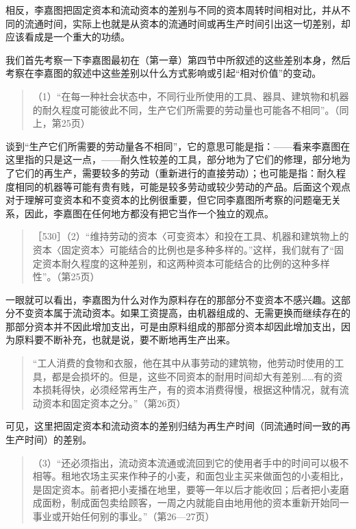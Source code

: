 相反，李嘉图把固定资本和流动资本的差别与不同的资本周转时间相对比，并从不同的流通时间，实际上也就是从资本的流通时间或再生产时间引出这一切差别，却应该看成是一个重大的功绩。

我们首先考察一下李嘉图最初在（第一章）第四节中所叙述的这些差别本身，然后考察在李嘉图的叙述中这些差别以什么方式影响或引起“相对价值”的变动。

\begin{quote}{（1）“在每一种社会状态中，不同行业所使用的工具、器具、建筑物和机器的耐久程度可能彼此不同，生产它们所需要的劳动量也可能各不相同”。（同上，第25页）}\end{quote}

谈到“生产它们所需要的劳动量各不相同”，它的意思可能是指：——看来李嘉图在这里指的只是这一点，——耐久性较差的工具，部分地为了它们的修理，部分地为了它们的再生产，需要较多的劳动（重新进行的直接劳动）；也可能是指：耐久程度相同的机器等可能有贵有贱，可能是较多劳动或较少劳动的产品。后面这个观点对于理解可变资本和不变资本的比例很重要，但它同李嘉图所考察的问题毫无关系，因此，李嘉图在任何地方都没有把它当作一个独立的观点。

\begin{quote}{［530］（2）“维持劳动的资本〈可变资本〉和投在工具、机器和建筑物上的资本〈固定资本〉可能结合的比例也是多种多样的。”这样，我们就有了“固定资本耐久程度的这种差别，和这两种资本可能结合的比例的这种多样性”。（第25页）}\end{quote}

一眼就可以看出，李嘉图为什么对作为原料存在的那部分不变资本不感兴趣。这部分不变资本属于流动资本。如果工资提高，由机器组成的、无需更换而继续存在的那部分资本并不因此增加支出，可是由原料组成的那部分资本却因此增加支出，因为原料要不断补充，也就是说，要不断地再生产出来。

\begin{quote}{“工人消费的食物和衣服，他在其中从事劳动的建筑物，他劳动时使用的工具，都是会损坏的。但是，这些不同资本的耐用时间却大有差别……有的资本损耗得快，必须经常再生产，有的资本消费得慢，根据这种情况，就有流动资本和固定资本之分。”（第26页）}\end{quote}

可见，这里把固定资本和流动资本的差别归结为再生产时间（同流通时间一致的再生产时间）的差别。

\begin{quote}{（3）“还必须指出，流动资本流通或流回到它的使用者手中的时间可以极不相等。租地农场主买来作种子的小麦，和面包业主买来做面包的小麦相比，是固定资本。前者把小麦播在地里，要等一年以后才能收回；后者把小麦磨成面粉，制成面包卖给顾客，一周之内就能自由地用他的资本重新开始同一事业或开始任何别的事业。”（第26—27页）}\end{quote}

